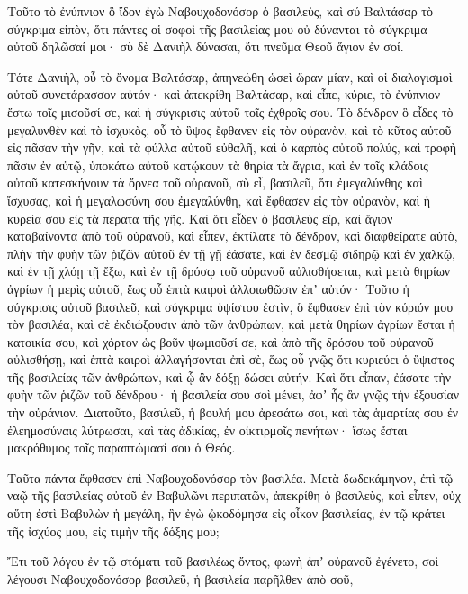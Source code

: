 {Τοῦτο τὸ ἐνύπνιον ὃ ἴδον ἐγὼ Ναβουχοδονόσορ ὁ βασιλεὺς, καὶ σύ Βαλτάσαρ τὸ σύγκριμα εἰπὸν, ὅτι πάντες οἱ σοφοὶ τῆς βασιλείας μου οὐ δύνανται τὸ σύγκριμα αὐτοῦ δηλῶσαί μοι· σὺ δὲ Δανιὴλ δύνασαι, ὅτι πνεῦμα Θεοῦ ἅγιον ἐν σοί.
\par }{\PP {}Τότε Δανιὴλ, οὗ τὸ ὄνομα Βαλτάσαρ, ἀπηνεώθη ὡσεὶ ὥραν μίαν, καὶ οἱ διαλογισμοὶ αὐτοῦ συνετάρασσον αὐτόν· καὶ ἀπεκρίθη Βαλτάσαρ, καὶ εἶπε, κύριε, τὸ ἐνύπνιον ἔστω τοῖς μισοῦσί σε, καὶ ἡ σύγκρισις αὐτοῦ τοῖς ἐχθροῖς σου.
Τὸ δένδρον ὃ εἶδες τὸ μεγαλυνθὲν καὶ τὸ ἰσχυκὸς, οὗ τὸ ὓψος ἔφθανεν εἰς τὸν οὐρανὸν, καὶ τὸ κῦτος αὐτοῦ εἰς πᾶσαν τὴν γῆν,
καὶ τὰ φύλλα αὐτοῦ εὐθαλῆ, καὶ ὁ καρπὸς αὐτοῦ πολύς, καὶ τροφὴ πᾶσιν ἐν αὐτῷ, ὑποκάτω αὐτοῦ κατῴκουν τὰ θηρία τὰ ἄγρια, καὶ ἐν τοῖς κλάδοις αὐτοῦ κατεσκήνουν τὰ ὄρνεα τοῦ οὐρανοῦ,
σὺ εἶ, βασιλεῦ, ὅτι ἐμεγαλύνθης καὶ ἴσχυσας, καὶ ἡ μεγαλωσύνη σου ἐμεγαλύνθη, καὶ ἔφθασεν εἰς τὸν οὐρανὸν, καὶ ἡ κυρεία σου εἰς τὰ πέρατα τῆς γῆς.
Καὶ ὅτι εἶδεν ὁ βασιλεὺς εἲρ, καὶ ἅγιον καταβαίνοντα ἀπὸ τοῦ οὐρανοῦ, καὶ εἶπεν, ἐκτίλατε τὸ δένδρον, καὶ διαφθείρατε αὐτὸ, πλὴν τὴν φυὴν τῶν ῥιζῶν αὐτοῦ ἐν τῇ γῇ ἐάσατε, καὶ ἐν δεσμῷ σιδηρῷ καὶ ἐν χαλκῷ, καὶ ἐν τῇ χλόῃ τῇ ἔξω, καὶ ἐν τῇ δρόσῳ τοῦ οὐρανοῦ αὐλισθήσεται, καὶ μετὰ θηρίων ἀγρίων ἡ μερὶς αὐτοῦ, ἕως οὗ ἑπτὰ καιροὶ ἀλλοιωθῶσιν ἐπʼ αὐτόν·
Τοῦτο ἡ σύγκρισις αὐτοῦ βασιλεῦ, καὶ σύγκριμα ὑψίστου ἐστὶν, ὃ ἔφθασεν ἐπὶ τὸν κύριόν μου τὸν βασιλέα,
καὶ σὲ ἐκδιώξουσιν ἀπὸ τῶν ἀνθρώπων, καὶ μετὰ θηρίων ἀγρίων ἔσται ἡ κατοικία σου, καὶ χόρτον ὡς βοῦν ψωμιοῦσί σε, καὶ ἀπὸ τῆς δρόσου τοῦ οὐρανοῦ αὐλισθήσῃ, καὶ ἑπτὰ καιροὶ ἀλλαγήσονται ἐπὶ σὲ, ἕως οὗ γνῷς ὅτι κυριεύει ὁ ὕψιστος τῆς βασιλείας τῶν ἀνθρώπων, καὶ ᾧ ἂν δόξῃ δώσει αὐτήν.
Καὶ ὅτι εἶπαν, ἐάσατε τὴν φυὴν τῶν ῥιζῶν τοῦ δένδρου· ἡ βασιλεία σου σοὶ μένει, ἀφʼ ἧς ἂν γνῷς τὴν ἐξουσίαν τὴν οὐράνιον.
Διατοῦτο, βασιλεῦ, ἡ βουλή μου ἀρεσάτω σοι, καὶ τὰς ἁμαρτίας σου ἐν ἐλεημοσύναις λύτρωσαι, καὶ τὰς ἀδικίας, ἐν οἰκτιρμοῖς πενήτων· ἴσως ἔσται μακρόθυμος τοῖς παραπτώμασί σου ὁ Θεός.
\par }{\PP {}Ταῦτα πάντα ἔφθασεν ἐπὶ Ναβουχοδονόσορ τὸν βασιλέα.
Μετὰ δωδεκάμηνον, ἐπὶ τῷ ναῷ τῆς βασιλείας αὐτοῦ ἐν Βαβυλῶνι περιπατῶν,
ἀπεκρίθη ὁ βασιλεὺς, καὶ εἶπεν, οὐχ αὕτη ἐστὶ Βαβυλὼν ἡ μεγάλη, ἣν ἐγὼ ᾠκοδόμησα εἰς οἶκον βασιλείας, ἐν τῷ κράτει τῆς ἰσχύος μου, εἰς τιμὴν τῆς δόξης μου;
\par }{\PP {}Ἔτι τοῦ λόγου ἐν τῷ στόματι τοῦ βασιλέως ὄντος, φωνὴ ἀπʼ οὐρανοῦ ἐγένετο, σοὶ λέγουσι Ναβουχοδονόσορ βασιλεῦ, ἡ βασιλεία παρῆλθεν ἀπὸ σοῦ,
}
